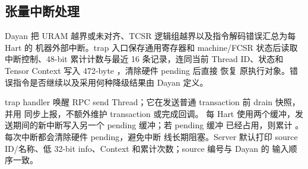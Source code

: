 \documentclass[../dayan_kernel_manual.tex]{subfiles}
\begin{document}
\subsection{张量中断处理}

Dayan 把 URAM 越界或未对齐、TCSR 逻辑组越界以及指令解码错误汇总为每 Hart 的
机器外部中断。trap 入口保存通用寄存器和 machine/FCSR 状态后读取中断控制、48-bit
累计计数与最近 16 条记录，连同当前 Thread ID、状态和 Tensor Context 写入
472-byte ，清除硬件 pending 后直接  恢复
原执行对象。错误指令是否继续以及采用何种降级结果由 Dayan 定义。

trap handler 唤醒 RPC send Thread；它在发送普通 transaction 前 drain 快照，并用
 同步上报，不额外维护 transaction 或完成回调。
每 Hart 使用两个缓冲，发送期间的新中断写入另一个 pending 缓冲；若 pending 缓冲
已经占用，则累计 。每次中断都会清除硬件 pending，避免中断
线长期阻塞。Server 默认打印 source ID/名称、低 32-bit info、Context 和累计次数；source
编号与 Dayan 的  输入顺序一致。
\end{document}
